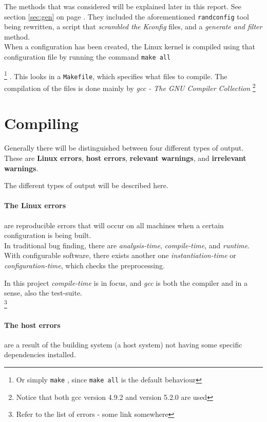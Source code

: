 \documentclass[a4paper,11pt]{report}
\newcommand{\textcode}[1]{
    \fboxsep=1pt
    \texttt{\colorbox{gray!20}{#1}}
}
\begin{document}
The methods that was considered will be explained later in this report. 
See section \ref{sec:gen} on page \pageref{sec:gen}.
They included the aforementioned \texttt{randconfig} tool being rewritten, a 
script that \emph{scrambled the Kconfig} files, and a \emph{generate and 
filter} method.
\\

When a configuration has been created, the Linux kernel is compiled using 
that configuration file by running the command \textcode{make all}
    \footnote{Or simply \textcode{make}, since \textcode{make all} is the 
        default behaviour}
. This looks in a \texttt{Makefile}, which specifies what files to compile. The 
compilation of the files is done mainly by \emph{gcc - The GNU Compiler 
Collection}
    \footnote{Notice that both gcc version 4.9.2 and version 5.2.0 are used}
\\

\section{Compiling}
Generally there will be distinguished between four different types of output. 
These are \textbf{Linux errors}, \textbf{host errors}, 
\textbf{relevant warnings}, and \textbf{irrelevant warnings}. 

The different types of output will be described here.


    \paragraph{The Linux errors} 
are reproducible errors that will occur on all 
machines when a certain configuration is being built. 
\\

In traditional bug finding, there are \emph{analysis-time}, 
\emph{compile-time}, and \emph{runtime}. With configurable software, there 
exists another one \emph{instantiation-time} or \emph{configuration-time}, 
which checks the preprocessing.
    \cite{IntDatSPL}

In this project \emph{compile-time} is in focus, and \emph{gcc} is both the 
compiler and in a sense, also the test-suite.
\\


    \footnote{Refer to the list of errors - some link somewhere}

    \paragraph{The host errors} 
are a result of the building system (a host system) not having some specific 
dependencies installed.
\\
\end{document}
